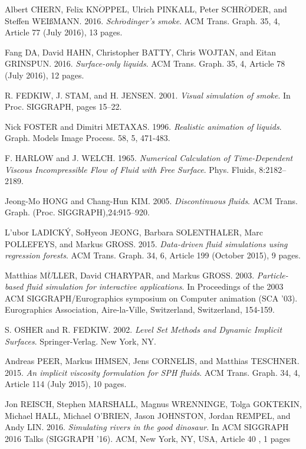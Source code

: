 \documentclass[11pt]{article}
\begin{document}
\newpage
\begin{thebibliography}{2} 

Albert CHERN, Felix KN$\ddot{O}$PPEL, Ulrich PINKALL, Peter SCHR$\ddot{O}$DER, and Steffen WEIßMANN. 2016.
\textit{Schr$\ddot{o}$dinger's smoke}.
 ACM Trans. Graph. 35, 4, Article 77 (July 2016), 13 pages. 

Fang DA, David HAHN, Christopher BATTY, Chris WOJTAN, and Eitan GRINSPUN. 2016.
\textit{Surface-only liquids}.
 ACM Trans. Graph. 35, 4, Article 78 (July 2016), 12 pages.

R. FEDKIW, J. STAM, and H. JENSEN. 2001.
\textit{Visual simulation of smoke}.
In Proc. SIGGRAPH, pages 15–22.

Nick FOSTER and Dimitri METAXAS. 1996.
\textit{Realistic animation of liquids}.
Graph. Models Image Process. 58, 5, 471-483.

F. HARLOW and J. WELCH. 1965.
\textit{Numerical Calculation of Time-Dependent Viscous Incompressible Flow of Fluid with Free Surface}.
Phys. Fluids, 8:2182–2189.

Jeong-Mo HONG and Chang-Hun KIM. 2005.
\textit{Discontinuous fluids}.
ACM Trans. Graph. (Proc. SIGGRAPH),24:915–920.

L'ubor LADICK\'{Y}, SoHyeon JEONG, Barbara SOLENTHALER, Marc POLLEFEYS, and Markus GROSS. 2015.
\textit{Data-driven fluid simulations using regression forests}.
ACM Trans. Graph. 34, 6, Article 199 (October 2015), 9 pages.

Matthias M$\ddot{U}$LLER, David CHARYPAR, and Markus GROSS. 2003.
\textit{Particle-based fluid simulation for interactive applications}.
In Proceedings of the 2003 ACM SIGGRAPH/Eurographics symposium on Computer animation (SCA '03). Eurographics Association, Aire-la-Ville, Switzerland, Switzerland, 154-159.

S. OSHER and R. FEDKIW. 2002.
\textit{Level Set Methods and Dynamic Implicit Surfaces}.
Springer-Verlag. New York, NY.

Andreas PEER, Markus IHMSEN, Jens CORNELIS, and Matthias TESCHNER. 2015.
\textit{An implicit viscosity formulation for SPH fluids}.
ACM Trans. Graph. 34, 4, Article 114 (July 2015), 10 pages.

Jon REISCH, Stephen MARSHALL, Magnus WRENNINGE, Tolga GOKTEKIN, Michael HALL, Michael O'BRIEN, Jason JOHNSTON, Jordan REMPEL, and Andy LIN. 2016.
\textit{ Simulating rivers in the good dinosaur}.
 In ACM SIGGRAPH 2016 Talks (SIGGRAPH '16). ACM, New York, NY, USA, Article 40 , 1 pages


\end{thebibliography}
\end{document}
